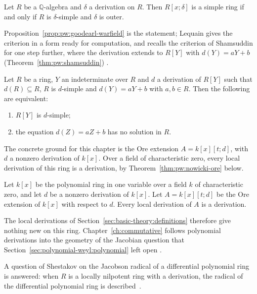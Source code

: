 \begin{proposition}
\label{prop:pw:goodearl-warfield}
Let $R$ be a $\mathbb{Q}$-algebra and $\delta$ a derivation on $R$. Then
$R[x;\delta]$ is a simple ring if and only if $R$ is $\delta$-simple and
$\delta$ is outer.
\end{proposition}

Proposition~\ref{prop:pw:goodearl-warfield} is the statement;
Lequain gives the criterion in a form ready for computation, and recalls
the criterion of Shamsuddin for one step further, where the derivation
extends to $R[Y]$ with $d(Y)=aY+b$ (Theorem~\ref{thm:pw:shamsuddin}) \cite[p.~802]{Lequain2008}.

\begin{theorem}
\label{thm:pw:shamsuddin}
Let $R$ be a ring, $Y$ an indeterminate over $R$ and $d$ a derivation of
$R[Y]$ such that $d(R)\subseteq R$, $R$ is $d$-simple and
$d(Y)=aY+b$ with $a,b\in R$. Then the following are equivalent:
\begin{enumerate}
\item $R[Y]$ is $d$-simple;
\item the equation $d(Z)=aZ+b$ has no solution in $R$.
\end{enumerate}
\end{theorem}

The concrete ground for this chapter is the Ore extension $A=k[x][t;d]$, with
$d$ a nonzero derivation of $k[x]$. Over a field of characteristic zero,
every local derivation of this ring is a derivation, by
Theorem~\ref{thm:pw:nowicki-ore} below. %


\begin{theorem}
\label{thm:pw:nowicki-ore}
Let $k[x]$ be the polynomial ring in one variable over a field $k$ of
characteristic zero, and let $d$ be a nonzero derivation of $k[x]$. Let
$A=k[x][t;d]$ be the Ore extension of $k[x]$ with respect to $d$. Every
local derivation of $A$ is a derivation.
\end{theorem}

The local derivations of
Section~\ref{sec:basic-theory:definitions} therefore give nothing new on
this ring. %
Chapter~\ref{ch:commutative} follows polynomial derivations into the
geometry of the Jacobian question that
Section~\ref{sec:polynomial-weyl:polynomial} left open %
\cite[p.~1]{BelovKanelKontsevich2007}.

A question of Shestakov on the Jacobson radical of a differential polynomial ring is answered: when $R$ is a locally nilpotent ring with a derivation, the radical of the differential polynomial ring is described~\cite{WlDifferentialPolynomialRingsOve2014}.
